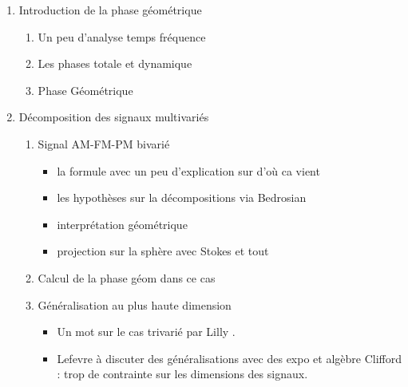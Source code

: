 

\begin{enumerate}[label=\arabic* --- ]\bfseries
	
	\item Introduction de la phase géométrique
	\begin{enumerate}[label=\arabic{enumi}.\arabic* --- ]
		
		\item Un peu d'analyse temps fréquence
		
		\item Les phases totale et dynamique
		
		\item Phase Géométrique
	\end{enumerate}	
	
	\item Décomposition des signaux multivariés
	\begin{enumerate}[label=\arabic{enumi}.\arabic* --- ]
		
		\item Signal AM-FM-PM bivarié
		\begin{itemize} \normalfont
			
			\item la formule avec un peu d'explication sur d'où ca vient
			
			\item les hypothèses sur la décompositions via Bedrosian
			
			\item interprétation géométrique
			
			\item projection sur la sphère avec Stokes et tout
			
		\end{itemize}
		
		\item Calcul de la phase géom dans ce cas
		
		\item Généralisation au plus haute dimension
		\begin{itemize}\normalfont
			
			\item Un mot sur le cas trivarié par Lilly \cite{lilly_modulated_2011}.
			
			\item Lefevre à discuter des généralisations \cite[sec. I.3]{lefevre_polarization_2021} avec des expo et algèbre Clifford : trop de contrainte sur les dimensions des signaux.
			

\end{itemize}
\end{enumerate}
\end{enumerate}
